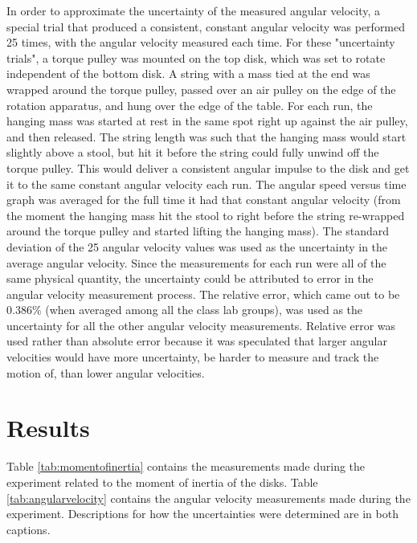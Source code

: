\documentclass[12pt]{iopart} %
\begin{document}
In order to approximate the uncertainty of the measured angular velocity, a special trial that produced a consistent, constant angular velocity was performed 25 times, with the angular velocity measured each time.
For these "uncertainty trials", a torque pulley was mounted on the top disk, which was set to rotate independent of the bottom disk.
A string with a mass tied at the end was wrapped around the torque pulley, passed over an air pulley on the edge of the rotation apparatus, and hung over the edge of the table.
For each run, the hanging mass was started at rest in the same spot right up against the air pulley, and then released.
The string length was such that the hanging mass would start slightly above a stool, but hit it before the string could fully unwind off the torque pulley.
This would deliver a consistent angular impulse to the disk and get it to the same constant angular velocity each run.
The angular speed versus time graph was averaged for the full time it had that constant angular velocity (from the moment the hanging mass hit the stool to right before the string re-wrapped around the torque pulley and started lifting the hanging mass).
The standard deviation of the 25 angular velocity values was used as the uncertainty in the average angular velocity.
Since the measurements for each run were all of the same physical quantity, the uncertainty could be attributed to error in the angular velocity measurement process.
The relative error, which came out to be 0.386\% (when averaged among all the class lab groups), was used as the uncertainty for all the other angular velocity measurements.
Relative error was used rather than absolute error because it was speculated that larger angular velocities would have more uncertainty, be harder to measure and track the motion of, than lower angular velocities.


\section{Results}

Table \ref{tab:momentofinertia} contains the measurements made during the experiment related to the moment of inertia of the disks.
Table \ref{tab:angularvelocity} contains the angular velocity measurements made during the experiment.
Descriptions for how the uncertainties were determined are in both captions.
\end{document}
